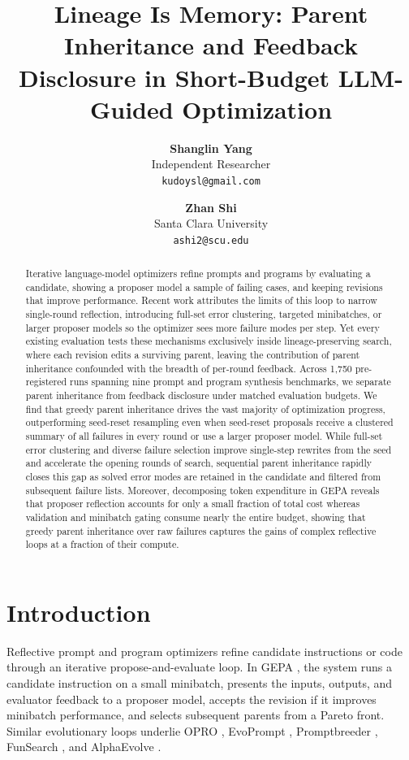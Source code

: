 \documentclass[10pt]{article}
\title{Lineage Is Memory: Parent Inheritance and Feedback Disclosure in Short-Budget LLM-Guided Optimization}
\author{
  \textbf{Shanglin Yang}\\
  Independent Researcher\\
  \texttt{kudoysl@gmail.com}
  \and
  \textbf{Zhan Shi}\\
  Santa Clara University\\
  \texttt{ashi2@scu.edu}
}
\date{}
\begin{document}
\maketitle
\begin{abstract}
Iterative language-model optimizers refine prompts and programs by
evaluating a candidate, showing a proposer model a sample of failing
cases, and keeping revisions that improve performance. Recent work
attributes the limits of this loop to narrow single-round reflection,
introducing full-set error clustering, targeted minibatches, or larger
proposer models so the optimizer sees more failure modes per step. Yet
every existing evaluation tests these mechanisms exclusively inside
lineage-preserving search, where each revision edits a surviving parent,
leaving the contribution of parent inheritance confounded with the
breadth of per-round feedback. Across 1,750 pre-registered runs spanning
nine prompt and program synthesis benchmarks, we separate parent
inheritance from feedback disclosure under matched evaluation budgets.
We find that greedy parent inheritance drives the vast majority of
optimization progress, outperforming seed-reset resampling even when
seed-reset proposals receive a clustered summary of all failures in
every round or use a larger proposer model. While full-set error
clustering and diverse failure selection improve single-step rewrites
from the seed and accelerate the opening rounds of search, sequential
parent inheritance rapidly closes this gap as solved error modes are
retained in the candidate and filtered from subsequent failure lists.
Moreover, decomposing token expenditure in GEPA reveals that proposer
reflection accounts for only a small fraction of total cost whereas
validation and minibatch gating consume nearly the entire budget,
showing that greedy parent inheritance over raw failures captures the
gains of complex reflective loops at a fraction of their compute.
\end{abstract}

\hypertarget{introduction}{%
\section{Introduction}\label{introduction}}

Reflective prompt and program optimizers refine candidate instructions
or code through an iterative propose-and-evaluate loop. In GEPA
\citep{a2025gepa}, the system runs a candidate instruction on a small
minibatch, presents the inputs, outputs, and evaluator feedback to a
proposer model, accepts the revision if it improves minibatch
performance, and selects subsequent parents from a Pareto front. Similar
evolutionary loops underlie OPRO \citep{yang2023large}, EvoPrompt
\citep{guo2023evoprompt}, Promptbreeder
\citep{fernando2023promptbreeder}, FunSearch
\citep{romeraparedes2023mathematical}, and AlphaEvolve
\citep{alexander2025alphaevolve}.
\end{document}
